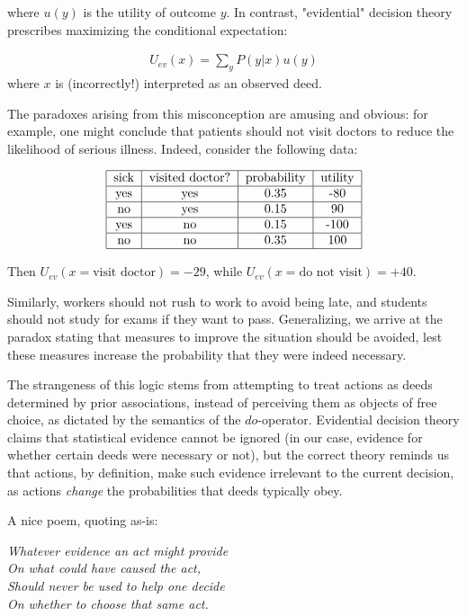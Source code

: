 \documentclass[fleqn]{article}
\numberwithin{equation}{section}
\numberwithin{theorem}{section}
\numberwithin{figure}{section}
\numberwithin{lemma}{section}
\numberwithin{corollary}{section}
\begin{document}
where $u(y)$ is the utility of outcome $y$. In contrast, "evidential" decision theory prescribes maximizing the conditional expectation:

\begin{align}
	U_{ev}(x) = \sum\limits_{y}P(y|x)u(y)
\end{align} 
where $x$ is (incorrectly!) interpreted as an observed deed.

The paradoxes arising from this misconception are amusing and obvious: for example, one might conclude that patients should not visit doctors to reduce the likelihood of serious illness. Indeed, consider the following data:

\begin{align}
	\begin{tabular}{|c|c|c|c|}
		\hline
		sick & visited doctor? & probability & utility \\
		\hline yes & yes & 0.35 & -80 \\
		\hline no & yes & 0.15 & 90  \\
		\hline yes & no & 0.15 & -100 \\
		\hline    no & no & 0.35 & 100 \\ \hline
	\end{tabular}
\end{align}

Then $U_{ev}(x=\text{visit doctor}) = -29$, while $U_{ev}(x=\text{do not visit}) = +40$.

Similarly, workers should not rush to work to avoid being late, and students should not study for exams if they want to pass. Generalizing, we arrive at the paradox stating that measures to improve the situation should be avoided, lest these measures increase the probability that they were indeed necessary.

The strangeness of this logic stems from attempting to treat actions as deeds determined by prior associations, instead of perceiving them as objects of free choice, as dictated by the semantics of the $do$-operator. Evidential decision theory claims that statistical evidence cannot be ignored (in our case, evidence for whether certain deeds were necessary or not), but the correct theory reminds us that actions, by definition, make such evidence irrelevant to the current decision, as actions \textit{change} the probabilities that deeds typically obey.

A nice poem, quoting as-is:

\begin{center}
	\textit{Whatever evidence an act might provide\\
		On what could have caused the act, \\
		Should never be used to help one decide \\
		On whether to choose that same act.}
\end{center}
\end{document}
